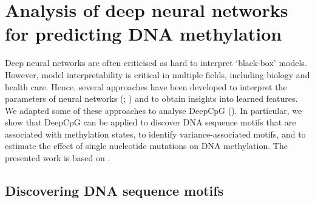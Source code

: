 \chapter{Analysis of deep neural networks for predicting DNA methylation} \label{sec:dcpg_ana}

\ifpdf
    \graphicspath{{Chapter5/Figs/Raster/}{Chapter5/Figs/PDF/}{Chapter5/Figs/}}
\else
    \graphicspath{{Chapter5/Figs/Vector/}{Chapter5/Figs/}}
\fi

Deep neural networks are often criticised as hard to interpret `black-box' models. However, model interpretability is critical in multiple fields, including biology and health care. Hence, several approaches have been developed to interpret the parameters of neural networks (; ) and to obtain insights into learned features. We adapted some of these approaches to analyse DeepCpG (). In particular, we show that DeepCpG can be applied to discover DNA sequence motifs that are associated with methylation states, to identify variance-associated motifs, and to estimate the effect of single nucleotide mutations on DNA methylation. The presented work is based on \citet{angermueller_accurate_2017}.


\section{Discovering DNA sequence motifs} \label{sec:dcpg_ana_motifs}

